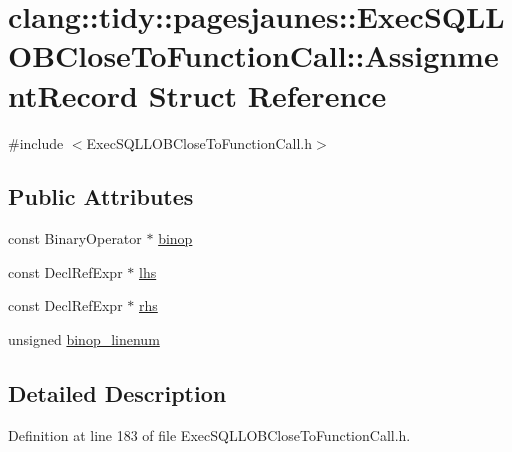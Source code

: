 \hypertarget{structclang_1_1tidy_1_1pagesjaunes_1_1_exec_s_q_l_l_o_b_close_to_function_call_1_1_assignment_record}{}\section{clang\+:\+:tidy\+:\+:pagesjaunes\+:\+:Exec\+S\+Q\+L\+L\+O\+B\+Close\+To\+Function\+Call\+:\+:Assignment\+Record Struct Reference}
\label{structclang_1_1tidy_1_1pagesjaunes_1_1_exec_s_q_l_l_o_b_close_to_function_call_1_1_assignment_record}


{\ttfamily \#include $<$Exec\+S\+Q\+L\+L\+O\+B\+Close\+To\+Function\+Call.\+h$>$}

\subsection*{Public Attributes}
\begin{DoxyCompactItemize}
\item 
const Binary\+Operator $\ast$ \hyperlink{structclang_1_1tidy_1_1pagesjaunes_1_1_exec_s_q_l_l_o_b_close_to_function_call_1_1_assignment_record_a19578222ad9e6a1add452c6f2bb436c4}{binop}
\item 
const Decl\+Ref\+Expr $\ast$ \hyperlink{structclang_1_1tidy_1_1pagesjaunes_1_1_exec_s_q_l_l_o_b_close_to_function_call_1_1_assignment_record_a38ae34f92320f3357e8ac514749fa07d}{lhs}
\item 
const Decl\+Ref\+Expr $\ast$ \hyperlink{structclang_1_1tidy_1_1pagesjaunes_1_1_exec_s_q_l_l_o_b_close_to_function_call_1_1_assignment_record_aefed5fbce08e7de1f6dc4f2cd63c27e2}{rhs}
\item 
unsigned \hyperlink{structclang_1_1tidy_1_1pagesjaunes_1_1_exec_s_q_l_l_o_b_close_to_function_call_1_1_assignment_record_aca053f9bf44887aeff1d83f6cb9787f1}{binop\+\_\+linenum}
\end{DoxyCompactItemize}


\subsection{Detailed Description}


Definition at line 183 of file Exec\+S\+Q\+L\+L\+O\+B\+Close\+To\+Function\+Call.\+h.



